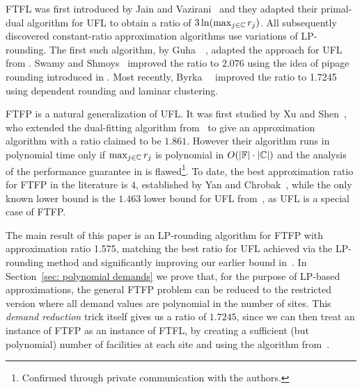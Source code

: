 \documentclass[11pt]{article}
\begin{document}
FTFL was first introduced by Jain and
Vazirani~\cite{JainV03} and they adapted their primal-dual
algorithm for UFL to obtain a ratio of
$3\ln(\max_{j\in\mathbb{C}}r_j)$.  All subsequently
discovered constant-ratio approximation algorithms use
variations of LP-rounding.  The first such algorithm, by
Guha~{\etal}~\cite{GuhaMM01}, adapted the approach for UFL
from \cite{ShmoysTA97}.  Swamy and Shmoys~\cite{SwamyS08}
improved the ratio to $2.076$ using the idea of pipage
rounding introduced in \cite{Svi02}. Most recently,
Byrka~{\etal}~\cite{ByrkaSS10} improved the ratio to 1.7245
using dependent rounding and laminar clustering.

FTFP is a natural generalization of UFL. It was first
studied by Xu and Shen~\cite{XuS09}, who extended the
dual-fitting algorithm from~\cite{JainMMSV03} to give an
approximation algorithm with a ratio claimed to be
$1.861$. However their algorithm runs in polynomial time
only if $\max_{j\in\mathbb{C}} r_j$ is polynomial in
$O(|\mathbb{F}|\cdot |\mathbb{C}|)$ and the analysis of the
performance guarantee in \cite{XuS09} is flawed\footnote{Confirmed through
  private communication with the authors.}.  To date, the
best approximation ratio for FTFP in the literature is $4$,
established by Yan and Chrobak~\cite{YanC11}, while the only
known lower bound is the $1.463$ lower bound for UFL
from~\cite{GuhaK98}, as UFL is a special case of FTFP.

\smallskip

The main result of this paper is an LP-rounding algorithm
for FTFP with approximation ratio 1.575, matching the best
ratio for UFL achieved via the LP-rounding method
\cite{ByrkaGS10} and significantly improving our earlier
bound in~\cite{YanC11}. In Section~\ref{sec: polynomial
  demands} we prove that, for the purpose of LP-based
approximations, the general FTFP problem can be reduced to
the restricted version where all demand values are
polynomial in the number of sites.  This \emph{demand
  reduction} trick itself gives us a ratio of $1.7245$,
since we can then treat an instance of FTFP as an instance
of FTFL, by creating a sufficient (but polynomial) number of
facilities at each site and using the algorithm
from~\cite{ByrkaSS10}.
\end{document}
